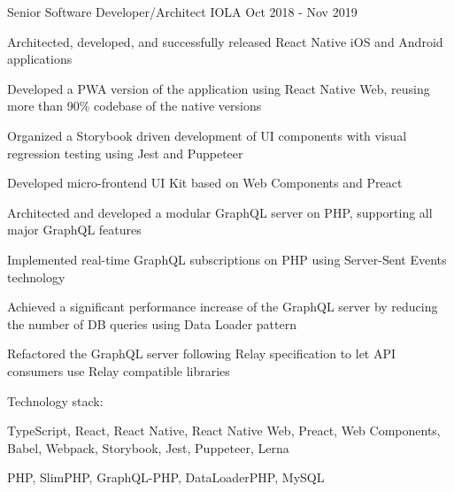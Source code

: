 \begin{cventries}
  \cventry
    {Senior Software Developer/Architect} %
    {IOLA} %
    {} %
    {Oct 2018 - Nov 2019} %
    {
      \begin{cvitems}
        \item Architected, developed, and successfully released React Native iOS and Android applications
        \item Developed a PWA version of the application using React Native Web, reusing more than 90\% codebase of the native versions
        \item Organized a Storybook driven development of UI components with visual regression testing using Jest and Puppeteer
        \item Developed micro-frontend UI Kit based on Web Components and Preact
        \item Architected and developed a modular GraphQL server on PHP, supporting all major GraphQL features
        \item Implemented real-time GraphQL subscriptions on PHP using Server-Sent Events technology
        \item Achieved a significant performance increase of the GraphQL server by reducing the number of DB queries using Data Loader pattern
        \item Refactored the GraphQL server following Relay specification to let API consumers use Relay compatible libraries
      \end{cvitems}
      \vspace{5mm}
      Technology stack:
      \begin{cvstackitems}
        \item TypeScript, React, React Native, React Native Web, Preact, Web Components, Babel, Webpack, Storybook, Jest, Puppeteer, Lerna
        \item PHP, SlimPHP, GraphQL-PHP, DataLoaderPHP, MySQL
      \end{cvstackitems}
      \vspace{-4.0mm}
    }


\end{cventries}
